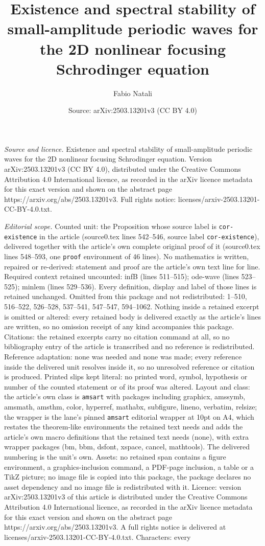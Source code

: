 \documentclass[10pt,a4paper]{amsart}
\title[Existence and spectral stability of small-amplitude periodic]{Existence and spectral stability of small-amplitude periodic waves for the 2D nonlinear focusing Schrodinger equation}
\author{Fabio Natali}
\date{Source: arXiv:2503.13201v3 (CC BY 4.0)}
\begin{document}
\maketitle

\noindent\emph{Source and licence.} Existence and spectral stability of small-amplitude periodic waves for the 2D nonlinear focusing Schrodinger equation. Version arXiv:2503.13201v3 (CC BY 4.0), distributed under the Creative Commons Attribution 4.0 International licence, as recorded in the arXiv licence metadata for this exact version and shown on the abstract page https://arxiv.org/abs/2503.13201v3. Full rights notice: licenses/arxiv-2503.13201-CC-BY-4.0.txt.\par\smallskip

\noindent\textit{Editorial scope.} Counted unit: the Proposition whose source label is \texttt{cor-existence} in the article (source0.tex lines 542--546, source label \texttt{cor-existence}), delivered together with the article's own complete original proof of it (source0.tex lines 548--593, one \texttt{proof} environment of 46 lines). No mathematics is written, repaired or re-derived: statement and proof are the article's own text line for line. Required context retained uncounted: infB (lines 511--515); ode-wave (lines 523--525); minlem (lines 529--536). Every definition, display and label of those lines is retained unchanged. Omitted from this package and not redistributed: 1--510, 516--522, 526--528, 537--541, 547--547, 594--1062. Nothing inside a retained excerpt is omitted or altered: every retained body is delivered exactly as the article's lines are written, so no omission receipt of any kind accompanies this package. Citations: the retained excerpts carry no citation command at all, so no bibliography entry of the article is transcribed and no reference is redistributed. Reference adaptation: none was needed and none was made; every reference inside the delivered unit resolves inside it, so no unresolved reference or citation is produced. Printed slips kept literal: no printed word, symbol, hypothesis or number of the counted statement or of its proof was altered. Layout and class: the article's own class is \texttt{amsart} with packages including graphicx, amssymb, amsmath, amsthm, color, hyperref, mathabx, subfigure, lineno, verbatim, relsize; the wrapper is the lane's pinned \texttt{amsart} editorial wrapper at 10pt on A4, which restates the theorem-like environments the retained text needs and adds the article's own macro definitions that the retained text needs (none), with extra wrapper packages (bm, bbm, dsfont, xspace, cancel, mathtools). The delivered numbering is the unit's own. Assets: no retained span contains a figure environment, a graphics-inclusion command, a PDF-page inclusion, a table or a TikZ picture; no image file is copied into this package, the package declares no asset dependency and no image file is redistributed with it. Licence: version arXiv:2503.13201v3 of this article is distributed under the Creative Commons Attribution 4.0 International licence, as recorded in the arXiv licence metadata for this exact version and shown on the abstract page https://arxiv.org/abs/2503.13201v3. A full rights notice is delivered at licenses/arxiv-2503.13201-CC-BY-4.0.txt. Characters: every 
\end{document}
